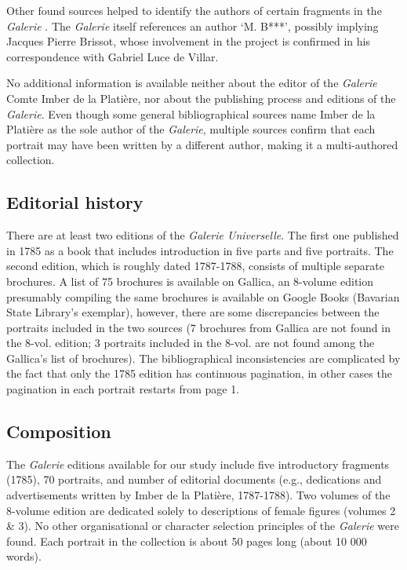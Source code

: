 \documentclass[12pt, letterpaper]{article}
\begin{document}
Other found sources helped to identify the authors of certain fragments in the \emph{Galerie} \footnotemark[1]. The \emph{Galerie} itself references an author `M. B***', possibly implying Jacques Pierre Brissot, whose involvement in the project is confirmed in his correspondence with Gabriel Luce de Villar.


No additional information is available neither about the editor of the \emph{Galerie} Comte Imber de la Platière, nor about the publishing process and editions of the \emph{Galerie}. Even though some general bibliographical sources name Imber de la Platière as the sole author of the \emph{Galerie}\footnotemark[2] , multiple sources confirm that each portrait may have been written by a different author, making it a multi-authored collection.

\subsection{Editorial history}
There are at least two editions of the \emph{Galerie Universelle}. The first one published in 1785 as a book that includes introduction in five parts and five portraits. The second edition, which is roughly dated 1787-1788, consists of multiple separate brochures. A list of 75 brochures is available on Gallica\footnotemark[3], an 8-volume edition presumably compiling the same brochures is available on Google Books (Bavarian State Library's exemplar), however, there are some discrepancies between the portraits included in the two sources (7 brochures from Gallica are not found in the 8-vol. edition; 3 portraits included in the 8-vol. are not found among the Gallica's list of brochures). The bibliographical inconsistencies are complicated by the fact that only the 1785 edition has continuous pagination, in other cases the pagination in each portrait restarts from page 1.

\subsection{Composition}
The \emph{Galerie} editions available for our study include five introductory fragments (1785), 70 portraits, and number of editorial documents (e.g., dedications and advertisements written by Imber de la Platière, 1787-1788). Two volumes of the 8-volume edition are dedicated solely to descriptions of female figures (volumes 2 \& 3). No other organisational or character selection principles of the \emph{Galerie} were found. Each portrait in the collection is about 50 pages long (about 10 000 words).
\end{document}
